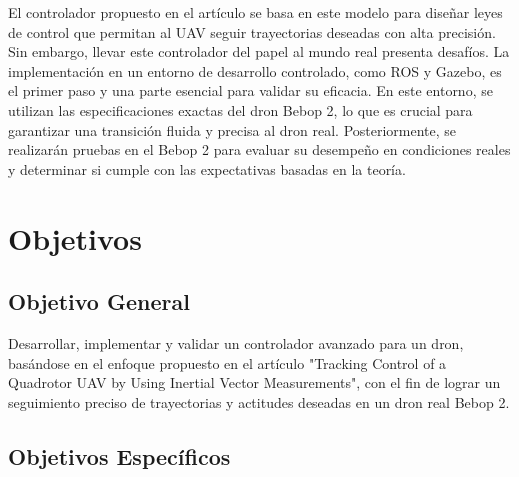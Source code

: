 El controlador propuesto en el artículo se basa en este modelo para diseñar leyes de control que permitan al UAV seguir trayectorias deseadas con alta precisión. Sin embargo, llevar este controlador del papel al mundo real presenta desafíos. La implementación en un entorno de desarrollo controlado, como ROS y Gazebo, es el primer paso y una parte esencial para validar su eficacia. En este entorno, se utilizan las especificaciones exactas del dron Bebop 2, lo que es crucial para garantizar una transición fluida y precisa al dron real. Posteriormente, se realizarán pruebas en el Bebop 2 para evaluar su desempeño en condiciones reales y determinar si cumple con las expectativas basadas en la teoría.

\section{Objetivos}
\subsection*{Objetivo General}

Desarrollar, implementar y validar un controlador avanzado para un dron, basándose en el enfoque propuesto en el artículo "Tracking Control of a Quadrotor UAV by Using Inertial Vector Measurements", con el fin de lograr un seguimiento preciso de trayectorias y actitudes deseadas en un dron real Bebop 2.

\subsection*{Objetivos Específicos}

